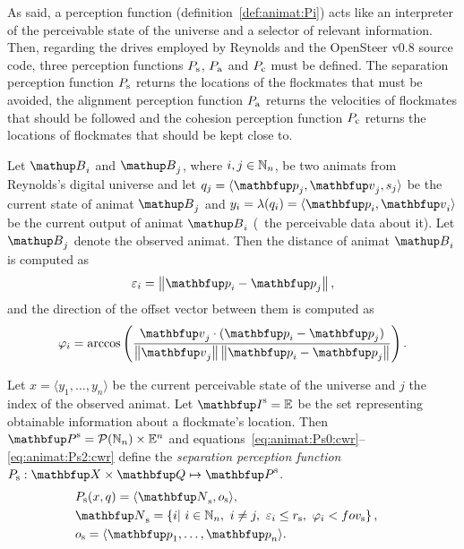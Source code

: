 As said, a perception function (definition~\ref{def:animat:Pi}) acts like an interpreter of the perceivable state of the universe and a selector of relevant information. Then, regarding the drives employed by Reynolds and the OpenSteer v0.8 source code, three perception functions $P_\textnormal{s}$, $P_\textnormal{a}$ and $P_\textnormal{c}$ must be defined. The separation perception function $P_\textnormal{s}$ returns the locations of the flockmates that must be avoided, the alignment perception function $P_\textnormal{a}$ returns the velocities of flockmates that should be followed and the cohesion perception function $P_\textnormal{c}$ returns the locations of flockmates that should be kept close to. 

Let $\autom{B}_i$ and $\autom{B}_j$, where $i,j \in \mathbb{N}_n$, be two animats from Reynolds's digital universe and let $q_j=\langle\vect{p}_j,\vect{v}_j,s_j\rangle$ be the current state of animat $\autom{B}_j$ and $y_i=\lambda(q_i)=\langle \vect{p}_i,\vect{v}_i \rangle$ be the current output of animat $\autom{B}_i$ (\ie\ the perceivable data about it). Let $\autom{B}_j$ denote the observed animat. Then the distance of animat $\autom{B}_i$ is computed as
%
\begin{equation}
\varepsilon_i%
 =\left\|\vect{p}_i - \vect{p}_j\right\|, \label{eq:animat:cwr:distance}
\end{equation}
%
and the direction of the offset vector between them is computed as
%
\begin{equation}
\varphi_i%
 =\arccos \left( \frac {\vect{v}_j \cdot (\vect{p}_i - \vect{p}_j)}{\left\| \vect{v}_j \right\| \left\| \vect{p}_i - \vect{p}_j \right\|} \right). \label{eq:animat:cwr:angularOffset}
\end{equation}

\begin{definition}
\label{def:animat:Ps:cwr}
Let $x=\langle y_1,\ldots,y_n\rangle$ be the current perceivable state of the universe and $j$ the index of the observed animat. Let $\set{I}^\textnormal{s}=\E$ be the set representing obtainable information about a flockmate's location. Then $\set{P}^\textnormal{s}=\powset{\N_n} \times \E^n$ and equations~\eqref{eq:animat:Ps0:cwr}--\eqref{eq:animat:Ps2:cwr} define the \emph{separation perception function} $P_\textnormal{s}: \set{X} \times \set{Q} \mapsto \set{P}^\textnormal{s}$.
\begin{eqnarray}
& P_\textnormal{s}(x,q)=\langle\set{N}_\textnormal{s},o_\textnormal{s}\rangle, & \label{eq:animat:Ps0:cwr} \\
& \set{N}_\textnormal{s}=\left\{i|\ i \in \N_n,\ i \neq j,\ \varepsilon_i%
 \leq r_\textnormal{s},\ \varphi_i%
 < \fov_\textnormal{s} \right\}, & \\ 
& o_\textnormal{s}=\langle \vect{p}_1,\ldots,\vect{p}_n\rangle. & \label{eq:animat:Ps2:cwr}
\end{eqnarray}
\end{definition}

